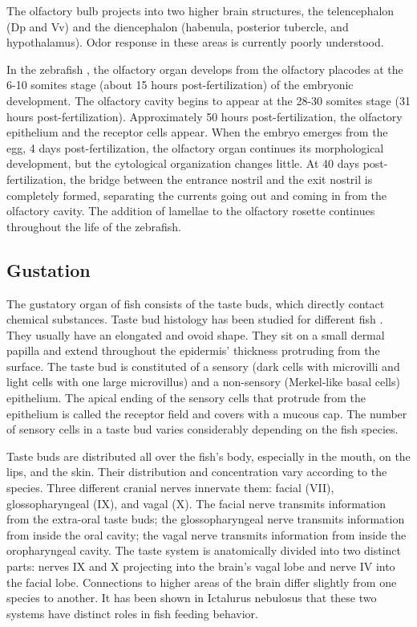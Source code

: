     The olfactory bulb projects into two higher brain structures, the telencephalon (Dp and Vv) and the diencephalon (habenula, posterior tubercle, and hypothalamus). Odor response in these areas is currently poorly understood.

    In the zebrafish \cite{hansen1993development,miyasaka2013functional}, the olfactory organ develops from the olfactory placodes at the 6-10 somites stage (about 15 hours post-fertilization) of the embryonic development. The olfactory cavity begins to appear at the 28-30 somites stage (31 hours post-fertilization). Approximately 50 hours post-fertilization, the olfactory epithelium and the receptor cells appear. When the embryo emerges from the egg, 4 days post-fertilization, the olfactory organ continues its morphological development, but the cytological organization changes little. At 40 days post-fertilization, the bridge between the entrance nostril and the exit nostril is completely formed, separating the currents going out and coming in from the olfactory cavity. The addition of lamellae to the olfactory rosette continues throughout the life of the zebrafish.

    \subsection{Gustation}
    The gustatory organ of fish consists of the taste buds, which directly contact chemical substances. Taste bud histology has been studied for different fish \cite{kapoor1976gustatory,fishelson2004taste,reutter2000heterogeneity,reutter1991ultrastructure,reutter2012taste}. They usually have an elongated and ovoid shape. They sit on a small dermal papilla and extend throughout the epidermis' thickness protruding from the surface. The taste bud is constituted of a sensory (dark cells with microvilli and light cells with one large microvillus) and a non-sensory (Merkel‐like basal cells) epithelium. The apical ending of the sensory cells that protrude from the epithelium is called the receptor field and covers with a mucous cap. The number of sensory cells in a taste bud varies considerably depending on the fish species.

    Taste buds are distributed all over the fish's body, especially in the mouth, on the lips, and the skin. Their distribution and concentration vary according to the species. Three different cranial nerves innervate them: facial (VII), glossopharyngeal (IX), and vagal (X). The facial nerve transmits information from the extra-oral taste buds; the glossopharyngeal nerve transmits information from inside the oral cavity; the vagal nerve transmits information from inside the oropharyngeal cavity. The taste system is anatomically divided into two distinct parts: nerves IX and X projecting into the brain's vagal lobe and nerve IV into the facial lobe. Connections to higher areas of the brain differ slightly from one species to another. It has been shown in Ictalurus nebulosus \cite{datema1971structures} that these two systems have distinct roles in fish feeding behavior.

